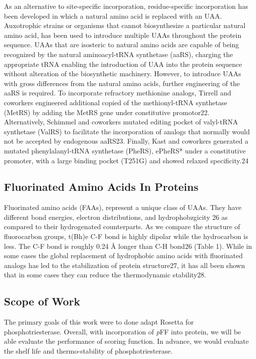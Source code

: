 \begin{refsection}
As an alternative to site-specific incorporation, residue-specific
incorporation has been developed in which a natural amino acid is replaced with
an UAA. Auxotrophic strains or organisms that cannot biosynthesize a particular
natural amino acid, has been used to introduce multiple UAAs throughout the
protein sequence. UAAs that are isosteric to natural amino acids are capable of
being recognized by the natural aminoacyl-tRNA synthetase (aaRS), charging the
appropriate tRNA enabling the introduction of UAA into the protein sequence
without alteration of the biosynthetic machinery. However, to introduce UAAs
with gross differences from the natural amino acids, further engineering of the
aaRS is required. To incorporate refractory methionine analogs, Tirrell and
coworkers engineered additional copied of the methionyl-tRNA synthetase (MetRS)
by adding the MetRS gene under constitutive promotor22. Alternatively, Schimmel
and coworkers mutated editing pocket of valyl-tRNA synthetase (ValRS) to
facilitate the incorporation of analogs that normally would not be accepted by
endogenous aaRS23. Finally, Kast and coworkers generated a mutated
phenylalanyl-tRNA synthetase (PheRS), ePheRS* under a constitutive promoter,
with a large binding pocket (T251G) and showed relaxed specificity.24

\subsection{Fluorinated Amino Acids In Proteins} 
\label{sec:faa}

Fluorinated amino acids (FAAs), represent a unique class of UAAs. They have
different bond energies, electron distributions, and hydrophobzgicity 26 as
compared to their hydrogenated counterparts. As we compare the structure of
fluorocarbon groups, t(Bh)e C-F bond is highly dipolar while the hydrocarbon is
less. The C-F bond is roughly 0.24 {\AA} longer than C-H bond26 (Table 1). While in
some cases the global replacement of hydrophobic amino acids with fluorinated
analogs has led to the stabilization of protein structure27, it has all been
shown that in some cases they can reduce the thermodynamic stability28.

\subsection{Scope of Work}

The primary goals of this work were to done adapt Rosetta for
phosphotriesterase. Overall, with incorporation of \emph{p}FF into protein, we
will be able evaluate the performance of scoring function. In advance, we would
evaluate the shelf life and thermo-stability of phosphotriesterase.


\end{refsection}
